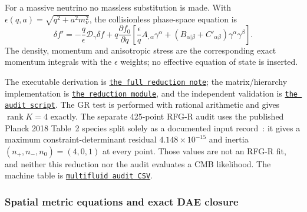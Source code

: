 \documentclass[11pt,a4paper]{article}
\newcommand{\RFGRepoURL}{https://github.com/MartinPetrasek123/MartinPetrasek123}
\newcommand{\RFGRepoNamed}[2]{\href{\RFGRepoURL/blob/main/r-universe-complete-chain/rfg-r-completion/r\_universe\_completion/#1}{\texttt{#2}}}
\begin{document}
For a massive neutrino no massless substitution is made.  With
\(\epsilon(q,a)=\sqrt{q^2+a^2m_\nu^2}\), the collisionless phase-space
equation is
\begin{equation}
 \delta f'=-\frac{q}{\epsilon}\mathcal D_\gamma\delta f
 +q\frac{\partial f_0}{\partial q}
 \left[\frac{\epsilon}{q}A_{,\alpha}\gamma^\alpha
 +(B_{\alpha|\beta}+C'_{\alpha\beta})\gamma^\alpha\gamma^\beta\right].
 \label{eq:RFGR-massive-neutrino}
\end{equation}
The density, momentum and anisotropic stress are the corresponding exact
momentum integrals with the \(\epsilon\) weights; no effective equation of
state is inserted.

The executable derivation is
\RFGRepoNamed{docs/photon\_baryon\_cdm\_neutrino\_reduction.md}{the full reduction note};
the matrix/hierarchy implementation is
\RFGRepoNamed{scripts/multifluid\_reduction.py}{the reduction module}, and
the independent validation is
\RFGRepoNamed{scripts/validate\_multifluid\_reduction.py}{the audit script}.
The GR test is performed with rational arithmetic and gives
\(\operatorname{rank}K=4\) exactly.  The separate 425-point RFG-R audit uses
the published Planck 2018 Table~2 species split solely as a documented input
record~\cite{Planck}: it gives a maximum constraint-determinant residual
\(4.148\times10^{-15}\) and inertia
\((n_+,n_-,n_0)=(4,0,1)\) at every point.  Those values are not an RFG-R fit,
and neither this reduction nor the audit evaluates a CMB likelihood.  The
machine table is
\RFGRepoNamed{generated/tables/multifluid\_core\_audit.csv}{multifluid audit CSV}.

\subsubsection{Spatial metric equations and exact DAE closure}
\label{sec:rfgr-dae-closure}
\end{document}
